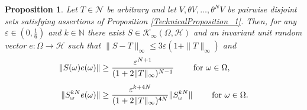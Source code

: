 \documentclass[pdflatex,sn-mathphys-num]{sn-jnl}%
\theoremstyle{thmstyleone}%
\newtheorem{proposition}[theorem]{Proposition}%
\theoremstyle{thmstyletwo}%
\theoremstyle{thmstylethree}%
\newcommand{\N}{\mathbb{N}}
\newcommand{\cH}{\mathcal{H}}
\newcommand{\cK}{\mathcal{K}}
\newcommand{\eps}{\varepsilon}
\numberwithin{equation}{section}
\begin{document}
\begin{proposition}\label{Millionschikov}
Let $T\in\mathcal N$ be arbitrary and let $V,\theta V,\dots, \theta^N V$ be pairwise disjoint sets satisfying assertions of Proposition \ref{TechnicalProposition_1}. Then, for any $\eps\in (0,\frac{1}{6})$ and $k\in \N$ there exist $S\in\cK_{\infty}(\Omega,\cH)$ and an invariant unit random vector $e:\Omega\rightarrow \cH$ such that $\|S-T\|_{\infty}\leq 3\eps (1+ \|T\|_{\infty})$ and
\begin{align}
\|S(\omega)e(\omega)\|
& \geq \frac{\eps^{N+1}}{(1+2\|T\|_{\infty})^{N-1}}\qquad\hbox{ for } \omega\in\Omega,\label{Lowerestimate}\\[1ex]
 \|S^{kN}_{\omega}e(\omega)\|
 & \geq  \frac{\eps^{k+4N}}{(1+2\|T\|_{\infty})^{4N}} \|S_{\omega}^{kN}\|\qquad\hbox{ for } \omega\in\Omega.\label{Goodgrowthrate}
\end{align}
\end{proposition}
\end{document}

